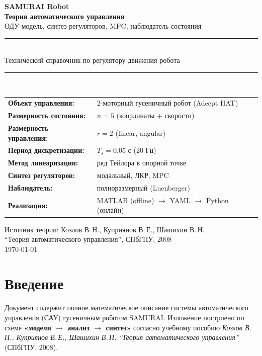 \documentclass[12pt, a4paper, openany]{book}
\numberwithin{equation}{chapter}
\begin{document}
\begin{titlepage}
\centering
\vspace*{2cm}
{\Huge\bfseries SAMURAI Robot}\\[0.4cm]
{\Large\bfseries Теория автоматического управления}\\[0.3cm]
{\large ОДУ-модель, синтез регуляторов, MPC, наблюдатель состояния}\\[1cm]
\rule{\textwidth}{1pt}\\[0.5cm]
{\large Технический справочник по регулятору движения робота}\\[0.5cm]
\rule{\textwidth}{1pt}\\[2cm]

\begin{tabular}{ll}
\textbf{Объект управления:} & 2-моторный гусеничный робот (Adeept HAT)\\
\textbf{Размерность состояния:} & $n=5$ (координаты + скорости)\\
\textbf{Размерность управления:} & $r=2$ (linear, angular)\\
\textbf{Период дискретизации:} & $T_s = 0.05$ с (20 Гц)\\
\textbf{Метод линеаризации:} & ряд Тейлора в опорной точке\\
\textbf{Синтез регуляторов:} & модальный, ЛКР, MPC\\
\textbf{Наблюдатель:} & полноразмерный (Luenberger)\\
\textbf{Реализация:} & MATLAB (offline) $\to$ YAML $\to$ Python (онлайн)\\
\end{tabular}

\vfill
{\large Источник теории: Козлов В.\,Н., Куприянов В.\,Е., Шашихин В.\,Н.\\
``Теория автоматического управления'', СПбГПУ, 2008}\\[0.5cm]
{\large\today}
\end{titlepage}

\tableofcontents
\newpage

\chapter*{Введение}

Документ содержит полное математическое описание системы автоматического
управления (САУ) гусеничным роботом SAMURAI. Изложение построено по схеме
\textbf{«модели $\to$ анализ $\to$ синтез»} согласно учебному пособию
\textit{Козлов В.\,Н., Куприянов В.\,Е., Шашихин В.\,Н. ``Теория автоматического
управления''} (СПбГПУ, 2008).
\end{document}
